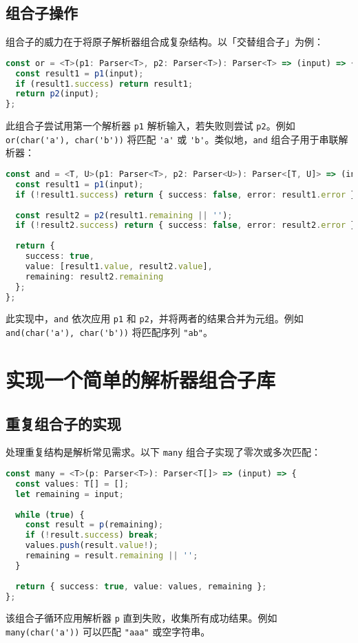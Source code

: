\section{组合子操作}
组合子的威力在于将原子解析器组合成复杂结构。以「交替组合子」为例：\par
\begin{lstlisting}[language=typescript]
const or = <T>(p1: Parser<T>, p2: Parser<T>): Parser<T> => (input) => {
  const result1 = p1(input);
  if (result1.success) return result1;
  return p2(input);
};
\end{lstlisting}
此组合子尝试用第一个解析器 \verb!p1! 解析输入，若失败则尝试 \verb!p2!。例如 \verb!or(char('a'), char('b'))! 将匹配 \verb!'a'! 或 \verb!'b'!。类似地，\verb!and! 组合子用于串联解析器：\par
\begin{lstlisting}[language=typescript]
const and = <T, U>(p1: Parser<T>, p2: Parser<U>): Parser<[T, U]> => (input) => {
  const result1 = p1(input);
  if (!result1.success) return { success: false, error: result1.error };
  
  const result2 = p2(result1.remaining || '');
  if (!result2.success) return { success: false, error: result2.error };
  
  return {
    success: true,
    value: [result1.value, result2.value],
    remaining: result2.remaining
  };
};
\end{lstlisting}
此实现中，\verb!and! 依次应用 \verb!p1! 和 \verb!p2!，并将两者的结果合并为元组。例如 \verb!and(char('a'), char('b'))! 将匹配序列 \verb!"ab"!。\par
\chapter{实现一个简单的解析器组合子库}
\section{重复组合子的实现}
处理重复结构是解析常见需求。以下 \verb!many! 组合子实现了零次或多次匹配：\par
\begin{lstlisting}[language=typescript]
const many = <T>(p: Parser<T>): Parser<T[]> => (input) => {
  const values: T[] = [];
  let remaining = input;
  
  while (true) {
    const result = p(remaining);
    if (!result.success) break;
    values.push(result.value!);
    remaining = result.remaining || '';
  }
  
  return { success: true, value: values, remaining };
};
\end{lstlisting}
该组合子循环应用解析器 \verb!p! 直到失败，收集所有成功结果。例如 \verb!many(char('a'))! 可以匹配 \verb!"aaa"! 或空字符串。\par

